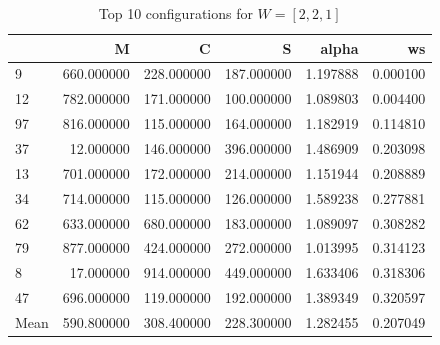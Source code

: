 \begin{frame}
    \begin{table}
        \caption{Top 10 configurations for \(W=[2, 2, 1]\)}
    \begin{tabular}{lrrrrr}
    \toprule
     & M & C & S & alpha & ws \\
    \midrule
    9 & 660.000000 & 228.000000 & 187.000000 & 1.197888 & 0.000100 \\
    12 & 782.000000 & 171.000000 & 100.000000 & 1.089803 & 0.004400 \\
    97 & 816.000000 & 115.000000 & 164.000000 & 1.182919 & 0.114810 \\
    37 & 12.000000 & 146.000000 & 396.000000 & 1.486909 & 0.203098 \\
    13 & 701.000000 & 172.000000 & 214.000000 & 1.151944 & 0.208889 \\
    34 & 714.000000 & 115.000000 & 126.000000 & 1.589238 & 0.277881 \\
    62 & 633.000000 & 680.000000 & 183.000000 & 1.089097 & 0.308282 \\
    79 & 877.000000 & 424.000000 & 272.000000 & 1.013995 & 0.314123 \\
    8 & 17.000000 & 914.000000 & 449.000000 & 1.633406 & 0.318306 \\
    47 & 696.000000 & 119.000000 & 192.000000 & 1.389349 & 0.320597 \\
    \midrule
    Mean & 590.800000 & 308.400000 & 228.300000 & 1.282455 & 0.207049 \\
    \bottomrule
    \end{tabular}
    \end{table}
\end{frame}

